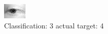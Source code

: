 \begin{figure}[h!]
\begin{center}
\includegraphics[width=0.60\columnwidth]{figures/ID2654_class_3_target_4.png}
\end{center}
\caption{ Classification: 3 actual target: 4}
\label{fig:ID2654_class_3_target_4}
\end{figure}
